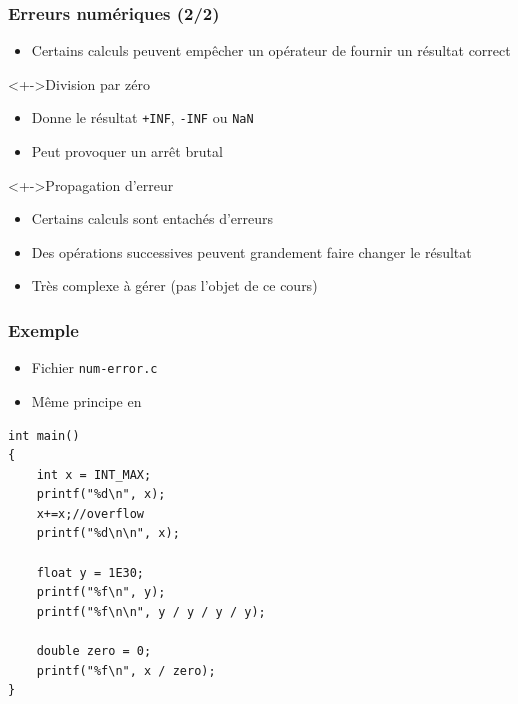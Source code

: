 \begin{frame}
\frametitle{Erreurs numériques (2/2)}
\begin{itemize}[<+->]
\item Certains calculs peuvent empêcher un opérateur de fournir un résultat correct
\end{itemize}
\begin{exampleblock}<+->{Division par zéro}
	\begin{itemize}[<+->]
	\item Donne le résultat \texttt{+INF}, \texttt{-INF} ou \texttt{NaN}
	\item Peut provoquer un arrêt brutal
	\end{itemize}
\end{exampleblock}
\begin{exampleblock}<+->{Propagation d'erreur}
	\begin{itemize}[<+->]
	\item Certains calculs sont entachés d'erreurs
	\item Des opérations successives peuvent grandement faire changer le résultat
	\item Très complexe à gérer (pas l'objet de ce cours)
	\end{itemize}
\end{exampleblock}
\end{frame}

\begin{frame}[containsverbatim]
\frametitle{Exemple}
\begin{itemize}
\item Fichier \texttt{num-error.c}
\item Même principe en \cpp
\end{itemize}
\begin{lstlisting}
int main()
{
	int x = INT_MAX;
	printf("%d\n", x);
	x+=x;//overflow
	printf("%d\n\n", x);

	float y = 1E30;   
	printf("%f\n", y);
    printf("%f\n\n", y / y / y / y);	

	double zero = 0;
	printf("%f\n", x / zero);
}
\end{lstlisting}
\end{frame}

